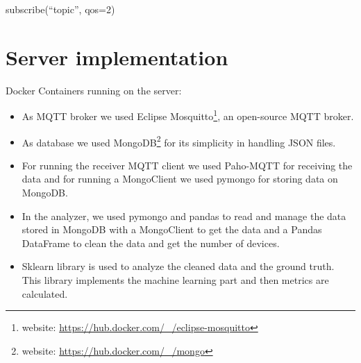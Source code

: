 subscribe(``topic'', qos=2)





\section{Server implementation}
\label{sec:server}
\vspace{0.2 cm} 

Docker Containers running on the server:
\begin{itemize}
  \item As MQTT broker we used Eclipse Mosquitto\footnote{ website: \url{https://hub.docker.com/_/eclipse-mosquitto} }, an open-source MQTT broker.
  \item As database we used MongoDB\footnote{ website: \url{https://hub.docker.com/_/mongo} } for its simplicity in handling JSON files.
  \item For running the receiver MQTT client we used Paho-MQTT for receiving the data and for running a MongoClient we used pymongo for storing data on MongoDB.
  \item In the analyzer, we used pymongo and pandas to read and manage the data stored in MongoDB with a MongoClient to get the data and a Pandas DataFrame to clean the data and get the number of devices.
  \item Sklearn library is used to analyze the cleaned data and the ground truth. This library implements the machine learning part and then metrics are calculated.
\end{itemize}
